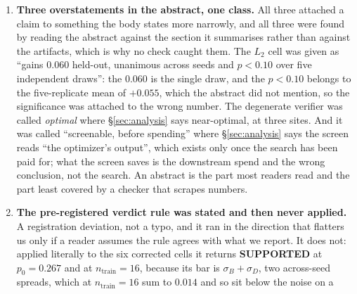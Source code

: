 \documentclass[11pt]{article}
\begin{document}
\begin{enumerate}
    and the surviving reading is the one Table~\ref{tab:splitresults}'s caption already argued,
    that its four cells are one quantity plus noise rather than four effects. The sentence never
    carried that qualifier, so the paper both supplied the counter-example and declined to count
    it, which leaves a reader to reconstruct the scope from a caption twenty pages away. All three
    sites then said \emph{replicates}, narrowed to \emph{re-measures} by entry~39, the larger
    cell is named where the estimate is discussed
    rather than left to be found, and the ordering is derived: one check reads the largest
    replicated $\dd$ from the artifacts and fails if another level overtakes it, another reads the
    named cell, and a third fails if that cell ever stops being the larger of the two. A
    superlative is a claim about a set, and this one never said which set.
  \item \textbf{Three overstatements in the abstract, one class.} All three attached a claim to
    something the body states more narrowly, and all three were found by reading the abstract
    against the section it summarises rather than against the artifacts, which is why no check
    caught them. The $L_2$ cell was given as ``gains $0.060$ held-out, unanimous across seeds and
    $p<0.10$ over five independent draws'': the $0.060$ is the single draw, and the $p<0.10$
    belongs to the five-replicate mean of $+0.055$, which the abstract did not mention, so the
    significance was attached to the wrong number. The degenerate verifier was called
    \emph{optimal} where \S\ref{sec:analysis} says near-optimal, at three sites. And it was
    called ``screenable, before spending'' where \S\ref{sec:analysis} says the screen reads
    ``the optimizer's output'', which exists only once the search has been paid for; what the
    screen saves is the downstream spend and the wrong conclusion, not the search. An abstract is
    the part most readers read and the part least covered by a checker that scrapes numbers.
  \item \textbf{The pre-registered verdict rule was stated and then never applied.} A
    registration deviation, not a typo, and it ran in the direction that flatters us only if a
    reader assumes the rule agrees with what we report. It does not: applied literally to the six
    corrected cells it returns \textbf{SUPPORTED} at $p_0 = 0.267$ and at
    $n_{\mathrm{train}} = 16$, because its bar is $\sigma_B + \sigma_D$, two across-seed
    spreads, which at $n_{\mathrm{train}} = 16$ sum to $0.014$ and so sit below the noise on a

\end{enumerate}
\end{document}
